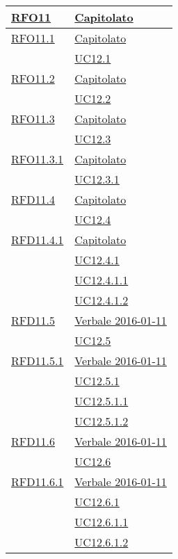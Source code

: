 \begin{longtable}{|>{\centering}m{5cm}|m{5cm}<{\centering}|}
\hyperlink{RFO11}{RFO11} & \hyperlink{Capitolato}{Capitolato}\\ \hline

\hyperlink{RFO11.1}{RFO11.1} & \hyperlink{Capitolato}{Capitolato}\\
& \hyperref[UC12.1]{UC12.1}\\ \hline

\hyperlink{RFO11.2}{RFO11.2} & \hyperlink{Capitolato}{Capitolato}\\
& \hyperref[UC12.2]{UC12.2}\\ \hline

\hyperlink{RFO11.3}{RFO11.3} & \hyperlink{Capitolato}{Capitolato}\\
& \hyperref[UC12.3]{UC12.3}\\ \hline

\hyperlink{RFO11.3.1}{RFO11.3.1} & \hyperlink{Capitolato}{Capitolato}\\
& \hyperref[UC12.3.1]{UC12.3.1}\\ \hline

\hyperlink{RFD11.4}{RFD11.4} & \hyperlink{Capitolato}{Capitolato}\\
& \hyperref[UC12.4]{UC12.4}\\ \hline

\hyperlink{RFD11.4.1}{RFD11.4.1} & \hyperlink{Capitolato}{Capitolato}\\
& \hyperref[UC12.4.1]{UC12.4.1}\\
& \hyperref[UC12.4.1.1]{UC12.4.1.1}\\
& \hyperref[UC12.4.1.2]{UC12.4.1.2}\\ \hline

\hyperlink{RFD11.5}{RFD11.5} & \hyperlink{Verbale 2016-01-11}{Verbale 2016-01-11}\\
& \hyperref[UC12.5]{UC12.5}\\ \hline

\hyperlink{RFD11.5.1}{RFD11.5.1} & \hyperlink{Verbale 2016-01-11}{Verbale 2016-01-11}\\
& \hyperref[UC12.5.1]{UC12.5.1}\\
& \hyperref[UC12.5.1.1]{UC12.5.1.1}\\
& \hyperref[UC12.5.1.2]{UC12.5.1.2}\\ \hline

\hyperlink{RFD11.6}{RFD11.6} & \hyperlink{Verbale 2016-01-11}{Verbale 2016-01-11}\\
& \hyperref[UC12.6]{UC12.6}\\ \hline

\hyperlink{RFD11.6.1}{RFD11.6.1} & \hyperlink{Verbale 2016-01-11}{Verbale 2016-01-11}\\
& \hyperref[UC12.6.1]{UC12.6.1}\\
& \hyperref[UC12.6.1.1]{UC12.6.1.1}\\
& \hyperref[UC12.6.1.2]{UC12.6.1.2}\\ \hline


\end{longtable}
